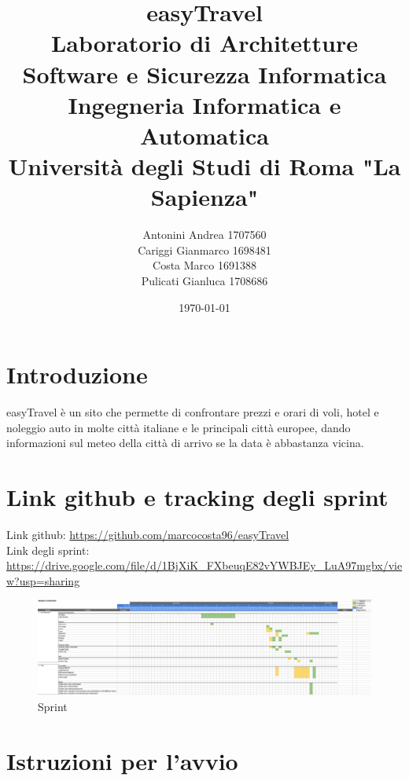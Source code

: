\documentclass[11pt]{article}
\title{\textbf{easyTravel} \\ \bigskip \large Laboratorio di Architetture Software e Sicurezza Informatica \\ Ingegneria Informatica e Automatica \\ Università degli Studi di Roma "La Sapienza"}
\author{Antonini Andrea 1707560\\Cariggi Gianmarco 1698481\\Costa Marco 1691388\\Pulicati Gianluca 1708686}
\date{\today}
\begin{document}
\maketitle

\pagebreak

\tableofcontents

\pagebreak

\section{Introduzione}

easyTravel è un sito che permette di confrontare prezzi e orari di voli, hotel e noleggio auto in molte
città italiane e le principali città europee, dando informazioni sul meteo della città di arrivo se la data è abbastanza vicina.


\section{Link github e tracking degli sprint}

Link github: \href{https://github.com/marcocosta96/easyTravel}{https://github.com/marcocosta96/easyTravel} \\
Link degli sprint: \href{https://drive.google.com/file/d/1BjXiK_FXbeuqE82vYWBJEy_LuA97mgbx/view?usp=sharing}{https://drive.google.com/file/d/1BjXiK\_FXbeuqE82vYWBJEy\_LuA97mgbx/view?usp=sharing}
\begin{figure}[!ht]
	\includegraphics[width=1\textwidth]{./sprint} %
	\caption{Sprint}
	\label{fig:sprint}
\end{figure}


\section{Istruzioni per l'avvio}
\end{document}
